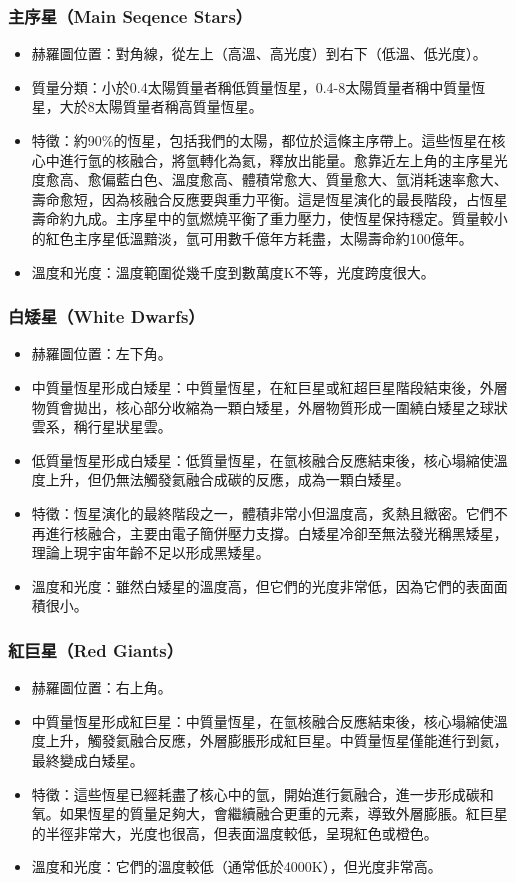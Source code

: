 \documentclass[a4paper,12pt]{report}
\begin{document}
\subsubsection{主序星（Main Seqence Stars）}
\begin{itemize}
\item 赫羅圖位置：對角線，從左上（高溫、高光度）到右下（低溫、低光度）。
\item 質量分類：小於0.4太陽質量者稱低質量恆星，0.4-8太陽質量者稱中質量恆星，大於8太陽質量者稱高質量恆星。
\item 特徵：約90\%的恆星，包括我們的太陽，都位於這條主序帶上。這些恆星在核心中進行氫的核融合，將氫轉化為氦，釋放出能量。愈靠近左上角的主序星光度愈高、愈偏藍白色、溫度愈高、體積常愈大、質量愈大、氫消耗速率愈大、壽命愈短，因為核融合反應要與重力平衡。這是恆星演化的最長階段，占恆星壽命約九成。主序星中的氫燃燒平衡了重力壓力，使恆星保持穩定。質量較小的紅色主序星低溫黯淡，氫可用數千億年方耗盡，太陽壽命約100億年。
\item 溫度和光度：溫度範圍從幾千度到數萬度K不等，光度跨度很大。
\end{itemize}
\subsubsection{白矮星（White Dwarfs）}
\begin{itemize}
\item 赫羅圖位置：左下角。
\item 中質量恆星形成白矮星：中質量恆星，在紅巨星或紅超巨星階段結束後，外層物質會拋出，核心部分收縮為一顆白矮星，外層物質形成一圍繞白矮星之球狀雲系，稱行星狀星雲。
\item 低質量恆星形成白矮星：低質量恆星，在氫核融合反應結束後，核心塌縮使溫度上升，但仍無法觸發氦融合成碳的反應，成為一顆白矮星。
\item 特徵：恆星演化的最終階段之一，體積非常小但溫度高，炙熱且緻密。它們不再進行核融合，主要由電子簡併壓力支撐。白矮星冷卻至無法發光稱黑矮星，理論上現宇宙年齡不足以形成黑矮星。
\item 溫度和光度：雖然白矮星的溫度高，但它們的光度非常低，因為它們的表面面積很小。
\end{itemize}
\subsubsection{紅巨星（Red Giants）}
\begin{itemize}
\item 赫羅圖位置：右上角。
\item 中質量恆星形成紅巨星：中質量恆星，在氫核融合反應結束後，核心塌縮使溫度上升，觸發氦融合反應，外層膨脹形成紅巨星。中質量恆星僅能進行到氦，最終變成白矮星。
\item 特徵：這些恆星已經耗盡了核心中的氫，開始進行氦融合，進一步形成碳和氧。如果恆星的質量足夠大，會繼續融合更重的元素，導致外層膨脹。紅巨星的半徑非常大，光度也很高，但表面溫度較低，呈現紅色或橙色。
\item 溫度和光度：它們的溫度較低（通常低於4000K），但光度非常高。
\end{itemize}
\end{document}
